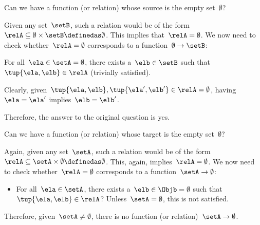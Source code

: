 \begin{exercise}
    Can we have a function (or relation) whose source is the empty set~$\emptyset$?
\end{exercise}
\begin{solution}
    Given any set~$\setB$, such a relation would be of the form~$\relA \subseteq \emptyset \times \setB \definedas \emptyset$. This implies that~$\relA=\emptyset$. We now need to check whether~$\relA=\emptyset$ corresponds to a function~$\emptyset\to \setB$:
    \begin{compactitem}
        \item For all~$\ela\in \setA=\emptyset$, there exists a~$\elb \in \setB$ such that $\tup{\ela,\elb}\in \relA$ (trivially satisfied).
        \item Clearly, given~$\tup{\ela,\elb}, \tup{\ela',\elb'}\in \relA=\emptyset$, having~$\ela=\ela'$ implies~$\elb=\elb'$.
    \end{compactitem}
    Therefore, the answer to the original question is yes.
\end{solution}

\begin{exercise}
    Can we have a function (or relation) whose target is the empty set~$\emptyset$?
\end{exercise}
\begin{solution}
    Again, given any set~$\setA$, such a relation would be of the form~$\relA \subseteq \setA \times \emptyset\definedas \emptyset$. This, again, implies~$\relA=\emptyset$. We now need to check whether~$\relA=\emptyset$ corresponds to a function~$\setA \to \emptyset$:
    \begin{itemize}
        \item For all~$\ela\in \setA$, there exists a~$\elb\in \Objb=\emptyset$ such that~$\tup{\ela,\elb}\in \relA$? Unless~$\setA=\emptyset$, this is not satisfied.
    \end{itemize}
    Therefore, given~$\setA \neq \emptyset$, there is no function (or relation)~$\setA \to \emptyset$.
\end{solution}